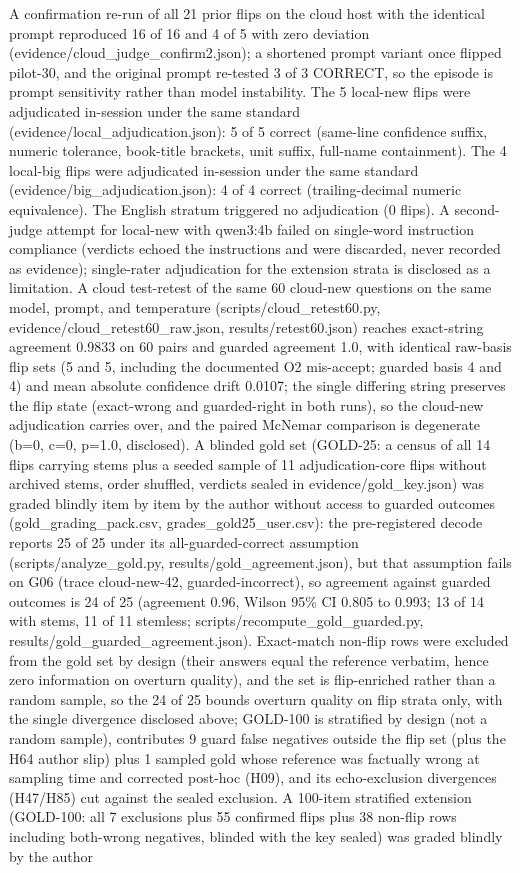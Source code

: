 \documentclass[10pt]{article} %
\begin{document}
A confirmation re-run of all 21 prior flips on the cloud host with the identical prompt reproduced 16 of 16 and 4 of 5 with zero deviation (evidence/cloud\_judge\_confirm2.json); a shortened prompt variant once flipped pilot-30, and the original prompt re-tested 3 of 3 CORRECT, so the episode is prompt sensitivity rather than model instability. The 5 local-new flips were adjudicated in-session under the same standard (evidence/local\_adjudication.json): 5 of 5 correct (same-line confidence suffix, numeric tolerance, book-title brackets, unit suffix, full-name containment). The 4 local-big flips were adjudicated in-session under the same standard (evidence/big\_adjudication.json): 4 of 4 correct (trailing-decimal numeric equivalence). The English stratum triggered no adjudication (0 flips). A second-judge attempt for local-new with qwen3:4b failed on single-word instruction compliance (verdicts echoed the instructions and were discarded, never recorded as evidence); single-rater adjudication for the extension strata is disclosed as a limitation. A cloud test-retest of the same 60 cloud-new questions on the same model, prompt, and temperature (scripts/cloud\_retest60.py, evidence/cloud\_retest60\_raw.json, results/retest60.json) reaches exact-string agreement 0.9833 on 60 pairs and guarded agreement 1.0, with identical raw-basis flip sets (5 and 5, including the documented O2 mis-accept; guarded basis 4 and 4) and mean absolute confidence drift 0.0107; the single differing string preserves the flip state (exact-wrong and guarded-right in both runs), so the cloud-new adjudication carries over, and the paired McNemar comparison is degenerate (b=0, c=0, p=1.0, disclosed). A blinded gold set (GOLD-25: a census of all 14 flips carrying stems plus a seeded sample of 11 adjudication-core flips without archived stems, order shuffled, verdicts sealed in evidence/gold\_key.json) was graded blindly item by item by the author without access to guarded outcomes (gold\_grading\_pack.csv, grades\_gold25\_user.csv): the pre-registered decode reports 25 of 25 under its all-guarded-correct assumption (scripts/analyze\_gold.py, results/gold\_agreement.json), but that assumption fails on G06 (trace cloud-new-42, guarded-incorrect), so agreement against guarded outcomes is 24 of 25 (agreement 0.96, Wilson 95\% CI 0.805 to 0.993; 13 of 14 with stems, 11 of 11 stemless; scripts/recompute\_gold\_guarded.py, results/gold\_guarded\_agreement.json). Exact-match non-flip rows were excluded from the gold set by design (their answers equal the reference verbatim, hence zero information on overturn quality), and the set is flip-enriched rather than a random sample, so the 24 of 25 bounds overturn quality on flip strata only, with the single divergence disclosed above; GOLD-100 is stratified by design (not a random sample), contributes 9 guard false negatives outside the flip set (plus the H64 author slip) plus 1 sampled gold whose reference was factually wrong at sampling time and corrected post-hoc (H09), and its echo-exclusion divergences (H47/H85) cut against the sealed exclusion. A 100-item stratified extension (GOLD-100: all 7 exclusions plus 55 confirmed flips plus 38 non-flip rows including both-wrong negatives, blinded with the key sealed) was graded blindly by the author 
\end{document}

